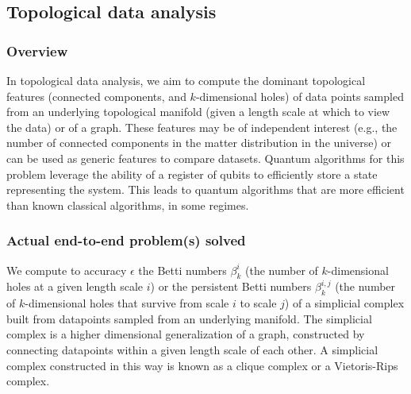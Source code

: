 \newpage











\begin{refsection}

\subsection{Topological data analysis}\label{appl:TDA}

\subsubsection*{Overview}
In topological data analysis, we aim to compute the dominant topological features (connected components, and $k$-dimensional holes) of data points sampled from an underlying topological manifold (given a length scale at which to view the data) or of a graph. These features may be of independent interest (e.g., the number of connected components in the matter distribution in the universe) or can be used as generic features to compare datasets. Quantum algorithms for this problem leverage the ability of a register of qubits to efficiently store a state representing the system. This leads to quantum algorithms that are more efficient than known classical algorithms, in some regimes.





\subsubsection*{Actual end-to-end problem(s) solved}
We compute to accuracy $\epsilon$ the Betti numbers $\beta_k^i$ (the number of $k$-dimensional holes at a given length scale $i$) or the
persistent Betti numbers $\beta_k^{i,j}$ (the number of $k$-dimensional holes that survive from scale $i$ to scale $j$) of a simplicial complex built from datapoints sampled from an underlying manifold. The simplicial complex is a higher dimensional generalization of a graph, constructed by connecting datapoints within a given length scale of each other. A simplicial complex constructed in this way is known as a clique complex or a Vietoris-Rips complex.


\end{refsection}
